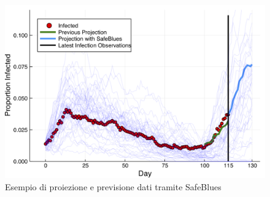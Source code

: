 \begin{figure}[h]
    \begin{center}
        \includegraphics[width=\linewidth]{img/fig1b.png}
        \caption{Esempio di proiezione e previsione dati tramite SafeBlues}
        \label{fig:data_prediction}
    \end{center}
\end{figure}